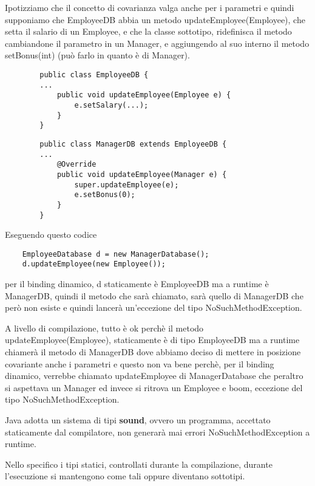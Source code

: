 Ipotizziamo che il concetto di covarianza valga anche per i parametri e quindi supponiamo che EmployeeDB abbia un metodo updateEmployee(Employee), che setta il salario di un Employee, e che la classe sottotipo, ridefinisca il metodo cambiandone il parametro in un Manager,  e aggiungendo al suo interno il metodo setBonus(int) (può farlo in quanto è di Manager).

\begin{multicols}{2}
    \begin{lstlisting}
        public class EmployeeDB {
        ...
            public void updateEmployee(Employee e) {
                e.setSalary(...);
            }
        }
    \end{lstlisting}    
    \columnbreak
    \begin{lstlisting}
        public class ManagerDB extends EmployeeDB {
        ...
            @Override
            public void updateEmployee(Manager e) {
                super.updateEmployee(e);
                e.setBonus(0);
            }
        }
    \end{lstlisting}
\end{multicols}

Eseguendo questo codice

\begin{lstlisting}
    EmployeeDatabase d = new ManagerDatabase();
    d.updateEmployee(new Employee());
\end{lstlisting}

per il binding dinamico, d staticamente è EmployeeDB ma a runtime è ManagerDB, quindi il metodo che sarà chiamato, sarà quello di ManagerDB che 
però non esiste e quindi lancerà un'eccezione del tipo NoSuchMethodException.

A livello di compilazione, tutto è ok perchè il metodo updateEmployee(Employee), staticamente è di tipo EmployeeDB ma a runtime chiamerà il metodo di ManagerDB 
dove abbiamo deciso di mettere in posizione covariante anche i parametri e questo non va bene perchè, per il binding dinamico, verrebbe chiamato updateEmployee
di ManagerDatabase che peraltro si aspettava un Manager ed invece si ritrova un Employee e boom, eccezione del tipo NoSuchMethodException.

Java adotta un sistema di tipi \textbf{sound}, ovvero un programma, accettato staticamente dal compilatore, non generarà mai errori NoSuchMethodException a runtime.

Nello specifico i tipi statici, controllati durante la compilazione, durante l’esecuzione si mantengono come tali oppure diventano sottotipi.

